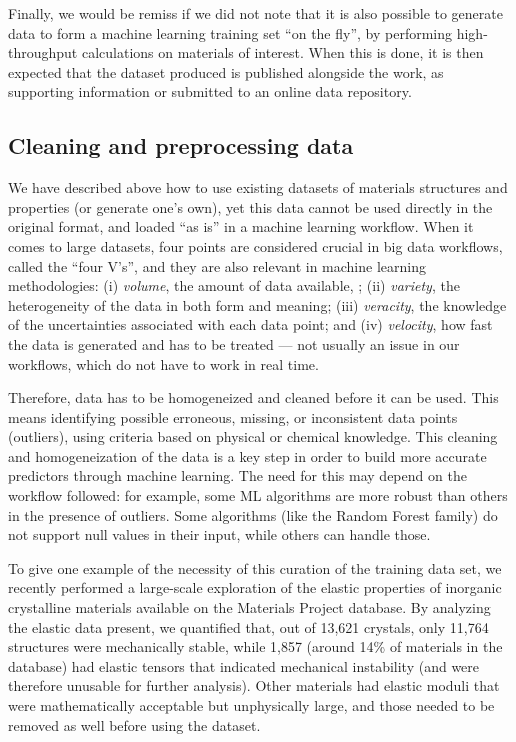 \documentclass[aip,apm,amsmath,amssymb,reprint]{revtex4-2}
\begin{document}
Finally, we would be remiss if we did not note that it is also possible to generate data to form a machine learning training set ``on the fly'', by performing high-throughput calculations on materials of interest. When this is done, it is then expected that the dataset produced is published alongside the work, as supporting information or submitted to an online data repository.


\subsection{Cleaning and preprocessing data}

We have described above how to use existing datasets of materials structures and properties (or generate one's own), yet this data cannot be used directly in the original format, and loaded ``as is'' in a machine learning workflow. When it comes to large datasets, four points are considered crucial in big data workflows, called the ``four V's'', and they are also relevant in machine learning methodologies: (i) \emph{volume}, the amount of data available, ; (ii) \emph{variety}, the heterogeneity of the data in both form and meaning; (iii) \emph{veracity}, the knowledge of the uncertainties associated with each data point; and (iv) \emph{velocity}, how fast the data is generated and has to be treated --- not usually an issue in our workflows, which do not have to work in real time.

Therefore, data has to be homogeneized and cleaned before it can be used. This means identifying possible erroneous, missing, or inconsistent data points (outliers), using criteria based on physical or chemical knowledge. This cleaning and homogeneization of the data is a key step in order to build more accurate predictors through machine learning. The need for this may depend on the workflow followed: for example, some ML algorithms are more robust than others in the presence of outliers. Some algorithms (like the Random Forest family) do not support null values in their input, while others can handle those.

To give one example of the necessity of this curation of the training data set, we recently performed a large-scale exploration of the elastic properties of inorganic crystalline materials available on the Materials Project database. By analyzing the elastic data present, we quantified that, out of 13,621 crystals, only 11,764 structures were mechanically stable, while 1,857 (around {14\%} of materials in the database) had elastic tensors that indicated mechanical instability (and were therefore unusable for further analysis).\cite{Chibani2019} Other materials had elastic moduli that were mathematically acceptable but unphysically large, and those needed to be removed as well before using the dataset.
\end{document}
